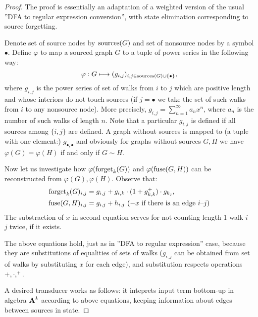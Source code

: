 \begin{proof}
        The proof is essentially an adaptation of a weighted version of the usual ''DFA to regular expression conversion'', with state elimination corresponding to source forgetting.
    
    Denote set of source nodes by $\operatorname{sources}(G)$ and set of nonsource nodes by a symbol $\bullet$. Define $\varphi$ to map a sourced graph $G$ to a tuple of power series in the following way:
    $$
    \varphi: G \longmapsto (g_{i,j})_{i,j \in \operatorname{sources}(G) \cup \{\bullet\}},
    $$
    where $g_{i,j}$ is the power series of set of walks from $i$ to $j$ which are positive length and whose interiors do not touch sources (if $j=\bullet$ we take the set of such walks from $i$ to any nonsource node). More precisely, $g_{i,j} = \sum_{n=1}^{\infty} a_n x^n$, where $a_n$ is the number of such walks of length $n$. Note that a particular $g_{i,j}$ is defined if all sources among $\{i,j\}$ are defined. A graph without sources is mapped to (a tuple with one element:) $g_{\bullet, \bullet}$ and obviously for graphs without sources $G, H$ we have $\varphi(G) = \varphi(H)$ if and only if $G \sim H$.
    
    Now let us investigate how $\varphi(\operatorname{forget}_k(G))$ and $\varphi(\operatorname{fuse}(G, H))$ can be reconstructed from $\varphi(G), \varphi(H)$.
    Observe that:
    \begin{align*}
    	\operatorname{forget}_k(G)_{i,j} &= g_{i,j} + g_{i,k}\cdot(1 + g_{k,k}^+)\cdot g_{k_j},\\
    	\operatorname{fuse}(G, H)_{i,j} &= g_{i,j} + h_{i,j} \ (- x \text{ if there is an edge } i\text{--}j)
    \end{align*}
    The substraction of $x$ in second equation serves for not counting length-1 walk $i$--$j$ twice, if it exists.
    
    The above equations hold, just as in ''DFA to regular expression'' case, because they are substitutions of equalities of sets of walks ($g_{i,j}$ can be obtained from set of walks by substituting $x$ for each edge), and substitution respects operations $+, \cdot, ^+$.
    
    A desired transducer works as follows: it inteprets input term bottom-up in algebra $\mathbf{A}^k$ according to above equations, keeping information about edges between sources in state.
\end{proof}

